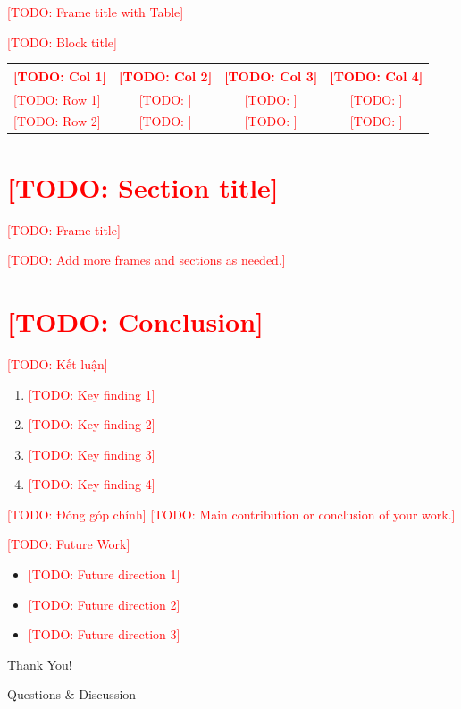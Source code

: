 \documentclass[aspectratio=169,10pt]{beamer}
\newcommand{\TODO}[1]{\textcolor{red}{[TODO: #1]}}
\begin{document}
\begin{frame}{\TODO{Frame title with Table}}

\begin{block}{\TODO{Block title}}
\centering
\renewcommand{\arraystretch}{1.2}
\begin{tabular}{|l|c|c|c|}
\hline
\textbf{\TODO{Col 1}} & \textbf{\TODO{Col 2}} & \textbf{\TODO{Col 3}} & \textbf{\TODO{Col 4}} \\
\hline
\TODO{Row 1} & \TODO{} & \TODO{} & \TODO{} \\
\TODO{Row 2} & \TODO{} & \TODO{} & \TODO{} \\
\hline
\end{tabular}
\end{block}

\end{frame}

\section{\TODO{Section title}}

\begin{frame}{\TODO{Frame title}}

\TODO{Add more frames and sections as needed.}

\end{frame}

\section{\TODO{Conclusion}}

\begin{frame}{\TODO{Kết luận}}

\begin{enumerate}
    \item \TODO{Key finding 1}
    \item \TODO{Key finding 2}
    \item \TODO{Key finding 3}
    \item \TODO{Key finding 4}
\end{enumerate}

\vspace{0.4cm}

\begin{block}{\TODO{Đóng góp chính}}
\TODO{Main contribution or conclusion of your work.}
\end{block}

\end{frame}

\begin{frame}{\TODO{Future Work}}

\begin{itemize}
    \item \TODO{Future direction 1}
    \item \TODO{Future direction 2}
    \item \TODO{Future direction 3}
\end{itemize}

\end{frame}

\begin{frame}
\centering
\Huge Thank You!

\vspace{0.5cm}
Questions \& Discussion
\end{frame}
\end{document}
